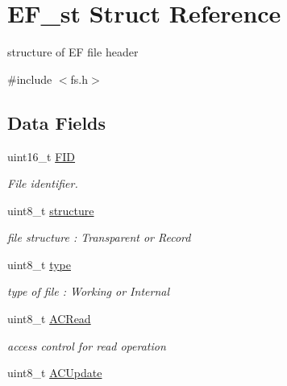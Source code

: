 \hypertarget{structEF__st}{\section{E\-F\-\_\-st Struct Reference}
\label{structEF__st}
}


structure of E\-F file header  




{\ttfamily \#include $<$fs.\-h$>$}

\subsection*{Data Fields}
\begin{DoxyCompactItemize}
\item 
\hypertarget{structEF__st_ab0f716dd423cdafeb57a8407c7e17c74}{uint16\-\_\-t \hyperlink{structEF__st_ab0f716dd423cdafeb57a8407c7e17c74}{F\-I\-D}}\label{structEF__st_ab0f716dd423cdafeb57a8407c7e17c74}

\begin{DoxyCompactList}\small\item\em File identifier. \end{DoxyCompactList}\item 
\hypertarget{structEF__st_aa461045dd393c1b2119bbac641223519}{uint8\-\_\-t \hyperlink{structEF__st_aa461045dd393c1b2119bbac641223519}{structure}}\label{structEF__st_aa461045dd393c1b2119bbac641223519}

\begin{DoxyCompactList}\small\item\em file structure \-: Transparent or Record \end{DoxyCompactList}\item 
\hypertarget{structEF__st_a768eec421a4d5759fbf5b257479b9a61}{uint8\-\_\-t \hyperlink{structEF__st_a768eec421a4d5759fbf5b257479b9a61}{type}}\label{structEF__st_a768eec421a4d5759fbf5b257479b9a61}

\begin{DoxyCompactList}\small\item\em type of file \-: Working or Internal \end{DoxyCompactList}\item 
\hypertarget{structEF__st_a20f6de743148b91bd033529b6460b9ba}{uint8\-\_\-t \hyperlink{structEF__st_a20f6de743148b91bd033529b6460b9ba}{A\-C\-Read}}\label{structEF__st_a20f6de743148b91bd033529b6460b9ba}

\begin{DoxyCompactList}\small\item\em access control for read operation \end{DoxyCompactList}\item 
\hypertarget{structEF__st_a61d3f83f8f10561ee4bfb904d52cf9da}{uint8\-\_\-t \hyperlink{structEF__st_a61d3f83f8f10561ee4bfb904d52cf9da}{A\-C\-Update}}\label{structEF__st_a61d3f83f8f10561ee4bfb904d52cf9da}


\end{DoxyCompactItemize}
